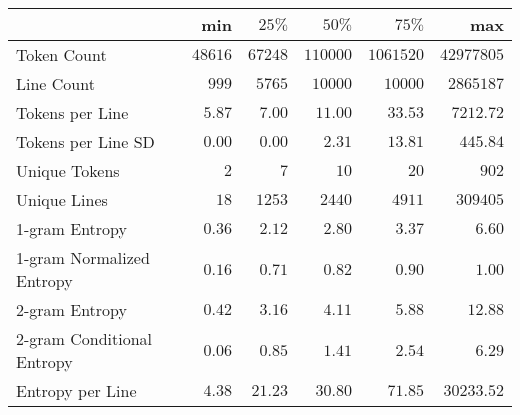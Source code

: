 \begin{tabular}{lrrrrr}
\toprule
 & min & $25\%$ & $50\%$ & $75\%$ & max \\
\midrule
Token Count & $48616$ & $67248$ & $110000$ & $1061520$ & $42977805$ \\
Line Count & $999$ & $5765$ & $10000$ & $10000$ & $2865187$ \\
Tokens per Line & $5.87$ & $7.00$ & $11.00$ & $33.53$ & $7212.72$ \\
Tokens per Line SD & $0.00$ & $0.00$ & $2.31$ & $13.81$ & $445.84$ \\
Unique Tokens & $2$ & $7$ & $10$ & $20$ & $902$ \\
Unique Lines & $18$ & $1253$ & $2440$ & $4911$ & $309405$ \\
1-gram Entropy & $0.36$ & $2.12$ & $2.80$ & $3.37$ & $6.60$ \\
1-gram Normalized Entropy & $0.16$ & $0.71$ & $0.82$ & $0.90$ & $1.00$ \\
2-gram Entropy & $0.42$ & $3.16$ & $4.11$ & $5.88$ & $12.88$ \\
2-gram Conditional Entropy & $0.06$ & $0.85$ & $1.41$ & $2.54$ & $6.29$ \\
Entropy per Line & $4.38$ & $21.23$ & $30.80$ & $71.85$ & $30233.52$ \\
\bottomrule
\end{tabular}
